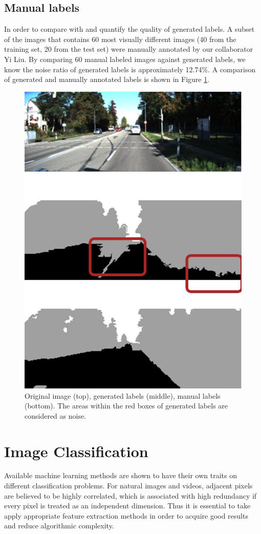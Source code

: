 \subsection{Manual labels}
\label{sec:Manual labels}
In order to compare with and quantify the quality of generated labels. A subset of the images that contains 60 most visually different images (40 from the training set, 20 from the test set) were manually annotated by our collaborator Yi Liu. By comparing 60 manual labeled images against generated labels, we know the noise ratio of generated labels is approximately 12.74\%. A comparison of generated and manually annotated labels is shown in Figure \ref{genfig}.

\begin{figure}[h!]
\centering
\includegraphics[width=0.6\linewidth]{pics/gen.png}
\caption{Original image (top), generated labels (middle), manual labels (bottom). The areas within the red boxes of generated labels are considered as noise.}
\label{genfig}
\end{figure}

\section{Image Classification}
\label{sec:Image Classification}
Available machine learning methods are shown to have their own traits on different classification problems. For natural images and videos, adjacent pixels are believed to be highly correlated, which is associated with high redundancy if every pixel is treated as an independent dimension. Thus it is essential to take apply appropriate feature extraction methods in order to acquire good results and reduce algorithmic complexity.

